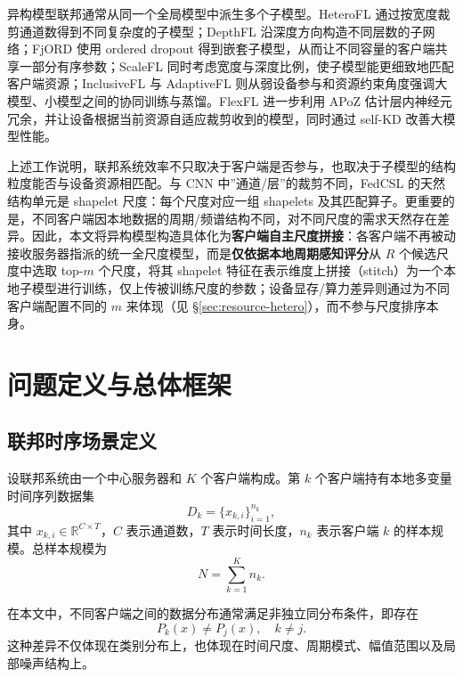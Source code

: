 \documentclass{article}
\begin{document}
异构模型联邦通常从同一个全局模型中派生多个子模型。HeteroFL 通过按宽度裁剪通道数得到不同复杂度的子模型\cite{heterofl}；DepthFL 沿深度方向构造不同层数的子网络\cite{depthfl}；FjORD 使用 ordered dropout 得到嵌套子模型，从而让不同容量的客户端共享一部分有序参数\cite{fjord}；ScaleFL 同时考虑宽度与深度比例，使子模型能更细致地匹配客户端资源\cite{scalefl}；InclusiveFL 与 AdaptiveFL 则从弱设备参与和资源约束角度强调大模型、小模型之间的协同训练与蒸馏\cite{inclusivefl,adaptivefl}。FlexFL 进一步利用 APoZ 估计层内神经元冗余，并让设备根据当前资源自适应裁剪收到的模型，同时通过 self-KD 改善大模型性能\cite{flexfl}。

上述工作说明，联邦系统效率不只取决于客户端是否参与，也取决于子模型的结构粒度能否与设备资源相匹配。与 CNN 中”通道/层”的裁剪不同，FedCSL 的天然结构单元是 shapelet 尺度：每个尺度对应一组 shapelets 及其匹配算子。更重要的是，不同客户端因本地数据的周期/频谱结构不同，对不同尺度的需求天然存在差异。因此，本文将异构模型构造具体化为\textbf{客户端自主尺度拼接}：各客户端不再被动接收服务器指派的统一全尺度模型，而是\textbf{仅依据本地周期感知评分}从 $R$ 个候选尺度中选取 top-$m$ 个尺度，将其 shapelet 特征在表示维度上拼接（stitch）为一个本地子模型进行训练，仅上传被训练尺度的参数；设备显存/算力差异则通过为不同客户端配置不同的 $m$ 来体现（见 §\ref{sec:resource-hetero}），而不参与尺度排序本身。

\section{问题定义与总体框架}

\subsection{联邦时序场景定义}

设联邦系统由一个中心服务器和 $K$ 个客户端构成。第 $k$ 个客户端持有本地多变量时间序列数据集
\begin{equation}
D_k = \{x_{k,i}\}_{i=1}^{n_k},
\end{equation}
其中 $x_{k,i}\in \mathbb{R}^{C\times T}$，$C$ 表示通道数，$T$ 表示时间长度，$n_k$ 表示客户端 $k$ 的样本规模。总样本规模为
\begin{equation}
N = \sum_{k=1}^{K} n_k.
\end{equation}

在本文中，不同客户端之间的数据分布通常满足非独立同分布条件，即存在
\begin{equation}
P_k(x)\neq P_j(x),\quad k\neq j.
\end{equation}
这种差异不仅体现在类别分布上，也体现在时间尺度、周期模式、幅值范围以及局部噪声结构上。
\end{document}
